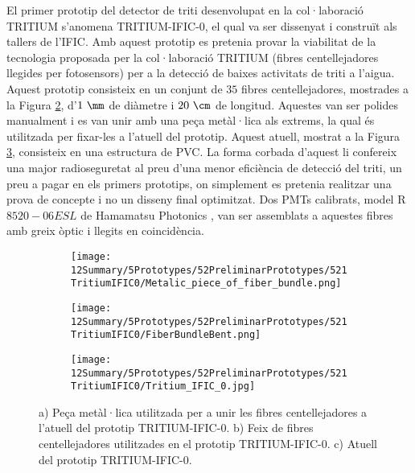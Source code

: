 El primer prototip del detector de triti desenvolupat en la col·laboració TRITIUM s'anomena TRITIUM-IFIC-0, el qual va ser dissenyat i construït als tallers de l'IFIC. Amb aquest prototip es pretenia provar la viabilitat de la tecnologia proposada per la col·laboració TRITIUM (fibres centellejadores llegides per fotosensors) per a la detecció de baixes activitats de triti a l'aigua. Aquest prototip consisteix en un conjunt de $35$ fibres centellejadores, mostrades a la Figura \ref{subfig:FibresDobladesTritiumIFIC0}, d'$1~\mm$ de diàmetre i $20~\cm$ de longitud. Aquestes van ser polides manualment i es van unir amb una peça metàl·lica als extrems, la qual és utilitzada per fixar-les a l'atuell del prototip. Aquest atuell, mostrat a la Figura \ref{subfig:PrototipTritiumIFIC0}, consisteix en una estructura de PVC. La forma corbada d'aquest li confereix una major radioseguretat al preu d'una menor eficiència de detecció del triti, un preu a pagar en els primers prototips, on simplement es pretenia realitzar una prova de concepte i no un disseny final optimitzat. Dos PMTs calibrats, model R$8520-06ESL$ de Hamamatsu Photonics \cite{DataSheetPMTs}, van ser assemblats a aquestes fibres amb greix òptic \cite{OpticalGrease} i llegits en coincidència.

\begin{figure}
\centering
    \begin{subfigure}[b]{0.5\textwidth}
    \centering
    \texttt{[image: 12Summary/5Prototypes/52PreliminarPrototypes/521TritiumIFIC0/Metalic\_piece\_of\_fiber\_bundle.png]}  
    \caption{\label{subfig:PesaMetalicaFibresTritiumIFIC0}}
    \end{subfigure}
    \hfill
    \begin{subfigure}[b]{0.4\textwidth}
    \centering
    \texttt{[image: 12Summary/5Prototypes/52PreliminarPrototypes/521TritiumIFIC0/FiberBundleBent.png]}  
    \caption{\label{subfig:FibresDobladesTritiumIFIC0}}
    \end{subfigure}
    \hfill
    \begin{subfigure}[b]{0.7\textwidth}
    \centering
    \texttt{[image: 12Summary/5Prototypes/52PreliminarPrototypes/521TritiumIFIC0/Tritium\_IFIC\_0.jpg]}  
    \caption{\label{subfig:PrototipTritiumIFIC0}}
    \end{subfigure}
 \caption{a) Peça metàl·lica utilitzada per a unir les fibres centellejadores a l'atuell del prototip TRITIUM-IFIC-0. b) Feix de fibres centellejadores utilitzades en el prototip TRITIUM-IFIC-0. c) Atuell del prototip TRITIUM-IFIC-0.} \label{fig:TritiumIFIC0s}
\end{figure}

